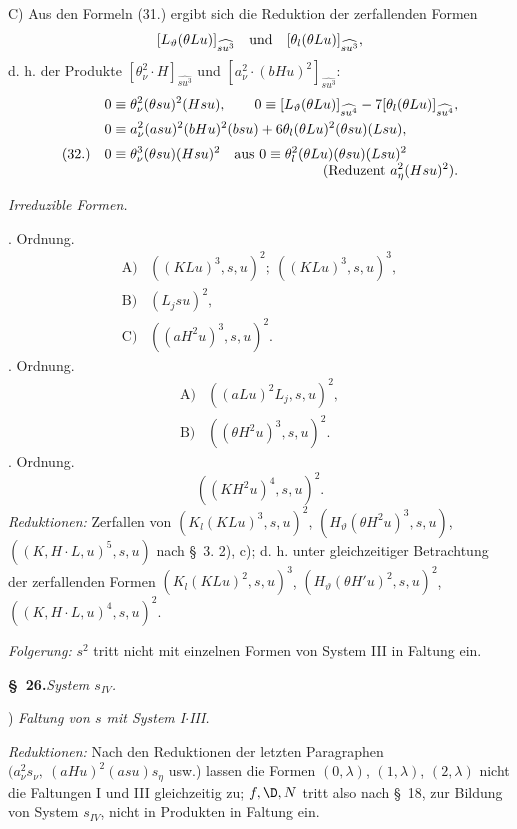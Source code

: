 C) Aus den Formeln (31.) ergibt sich die Reduktion der zerfallenden Formen
\[
 [L_\vartheta(\theta Lu)]_{\widehat{su^3}}\quad\hbox{und}\quad [\theta_l(\theta Lu)]_{\widehat{su^3}},
\]
d. h. der Produkte $[\theta_\nu^2\cdot H]_{\widehat{su^3}}$ und $[a_\nu^2\cdot(bHu)^2]_{\widehat{su^3}}$:
\[
\begin{array}{@{}r@{\quad}l@{}}
&\displaystyle 0\equiv\theta_\nu^2(\theta su)^2(Hsu),\qquad
0\equiv [L_\vartheta(\theta Lu)]_{\widehat{su^4}}-7[\theta_l(\theta Lu)]_{\widehat{su^4}},\\[0.55em]
&\displaystyle 0\equiv a_\nu^2(asu)^2(bHu)^2(bsu)+6\theta_l(\theta Lu)^2(\theta su)(Lsu),\\[0.55em]
(32.)&\displaystyle 0\equiv\theta_\nu^3(\theta su)(Hsu)^2
\quad\hbox{aus }0\equiv\theta_l^2(\theta Lu)(\theta su)(Lsu)^2\\[-0.05em]
&\displaystyle\hfill(\hbox{Reduzent }a_\eta^2(Hsu)^2).
\end{array}
\]

\noindent\emph{Irreduzible Formen.}

. Ordnung.
\[
\begin{array}{rl}
\text{A)}&((KLu)^3,s,u)^2;\ ((KLu)^3,s,u)^3,\\[0.25em]
\text{B)}&(L_jsu)^2,\\[0.25em]
\text{C)}&((aH^2u)^3,s,u)^2.
\end{array}
\]
. Ordnung.
\[
\begin{array}{rl}
\text{A)}&((aLu)^2L_j,s,u)^2,\\[0.25em]
\text{B)}&((\theta H^2u)^3,s,u)^2.
\end{array}
\]
. Ordnung.
\[
 ((KH^2u)^4,s,u)^2.
\]
\noindent\emph{Reduktionen:} Zerfallen von $(K_l(KLu)^3,s,u)^2$, $(H_\vartheta(\theta H^2u)^3,s,u)$, $((K,H\cdot L,u)^5,s,u)$ nach \S\ 3. 2), c); d. h. unter gleichzeitiger Betrachtung der zerfallenden Formen $(K_l(KLu)^2,s,u)^3$, $(H_\vartheta(\theta H'u)^2,s,u)^2$, $((K,H\cdot L,u)^4,s,u)^2$.

\noindent\emph{Folgerung:} $s^2$ tritt nicht mit einzelnen Formen von System III in Faltung ein.

\begin{center}\textbf{\S\ 26.}\quad\emph{System $s_{IV}$.}\end{center}
) \emph{Faltung von $s$ mit System I$\cdot$III.}

\noindent\emph{Reduktionen:} Nach den Reduktionen der letzten Paragraphen $(a_\nu^2s_\nu,\ (aHu)^2(asu)s_\eta$ usw.) lassen die Formen $(0,\lambda)$, $(1,\lambda)$, $(2,\lambda)$ nicht die Faltungen I und III gleichzeitig zu; $f,\D,N$ tritt also nach \S\ 18, zur Bildung von System $s_{IV}$, nicht in Produkten in Faltung ein.

